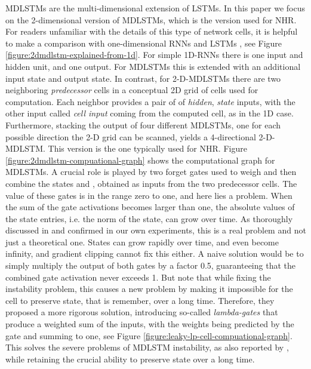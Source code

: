 \documentclass[conference]{IEEEtran}
\renewcommand{\ac}[1]{\gls{#1}}
\renewcommand{\acp}[1]{\glspl{#1}}
\begin{document}
\acp{MDLSTM} \cite{mdlstmsGraves2007} are the multi-dimensional extension of \acp{LSTM}. 
In this paper we focus on the 2-dimensional version of \acp{MDLSTM}, which is the version 
used for \ac{NHR}. For readers unfamiliar with the details of this type of network cells, it is helpful 
to make a comparison with one-dimensional \acp{RNN} and \acp{LSTM} \cite{Hochreiter:1997:LSMT}, 
see Figure \ref{figure:2dmdlstm-explained-from-1d}.
For simple 1D-\acp{RNN} there is one input and hidden unit, and one output. For \acp{MDLSTM} this is extended with an additional 
input state and output state. In contrast, for 2-D-\acp{MDLSTM} there are two 
neighboring \emph{predecessor} cells in a conceptual 2D grid of cells used for computation. Each neighbor provides a pair of 
of \emph{hidden}, \emph{state} inputs, with the other input called \emph{cell input}   
coming from the computed cell, as in the 1D case. 
Furthermore,  stacking the output of four different \acp{MDLSTM}, one for each possible direction 
the 2-D grid can be scanned, yields a 4-directional 2-D-\ac{MDLSTM}. 
This version is the one typically used for \ac{NHR}.
Figure \ref{figure:2dmdlstm-compuational-graph} shows the computational graph for \acp{MDLSTM}. A crucial role is played 
by two forget gates used to weigh and then combine the states  and , obtained as inputs from the two predecessor cells. 
The value of these gates is in the range zero to one, and here lies a problem. When the sum of the gate activations becomes larger than one, 
the absolute values of the state entries, i.e. the norm of the state, can grow over time. As thoroughly discussed in \cite{LeifertEtAl2014}
and confirmed in our own experiments, this is a real problem and not just a theoretical one. States can grow rapidly over time, 
and even become infinity, and gradient clipping cannot fix this either. A naive solution would be to simply multiply 
the output of both gates by a factor 0.5, guaranteeing that the combined gate activation never exceeds 1. But \cite{LeifertEtAl2014}
note that while fixing the instability problem, this causes a new problem by making it impossible for the cell to preserve state, that is 
remember, over a long time. Therefore, they proposed a more rigorous solution, introducing so-called \emph{lambda-gates} that 
produce a weighted sum of the inputs, with the weights being predicted by the gate and summing to one, see Figure \ref{figure:leaky-lp-cell-compuational-graph}. 
This solves the severe problems of \ac{MDLSTM} instability, as also reported by \cite{Voigtlaender2016}, 
while retaining the crucial ability to preserve state over a long time. 
\end{document}
